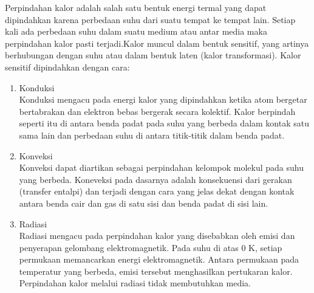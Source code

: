 
Perpindahan kalor adalah salah satu bentuk energi termal yang dapat dipindahkan karena perbedaan suhu dari suatu tempat ke tempat lain\cite{HeatTransferIncropera}. Setiap kali ada perbedaan suhu dalam suatu medium atau antar media maka perpindahan kalor pasti terjadi.Kalor muncul dalam bentuk sensitif, yang artinya berhubungan dengan suhu atau dalam bentuk laten (kalor transformasi). Kalor sensitif dipindahkan dengan cara: \cite{BuildingPhysics}

\begin{enumerate}
	\item Konduksi \\
	Konduksi mengacu pada energi kalor yang dipindahkan ketika atom bergetar bertabrakan dan elektron bebas bergerak secara kolektif. Kalor berpindah seperti itu di antara benda padat pada suhu yang berbeda dalam kontak satu sama lain dan perbedaan suhu di antara titik-titik dalam benda padat.
	\item Konveksi \\
	Konveksi dapat diartikan sebagai perpindahan kelompok molekul pada suhu yang berbeda. Koneveksi pada dasarnya adalah konsekuensi dari gerakan (transfer entalpi) dan terjadi dengan cara yang jelas dekat dengan kontak antara benda cair dan gas di satu sisi dan benda padat di sisi lain.
	\item Radiasi \\
	Radiasi mengacu pada perpindahan kalor yang disebabkan oleh emisi dan penyerapan gelombang elektromagnetik. Pada suhu di atas 0 K, setiap permukaan memancarkan energi elektromagnetik. Antara permukaan pada temperatur yang berbeda, emisi tersebut menghasilkan pertukaran kalor. Perpindahan kalor melalui radiasi tidak membutuhkan media.
\end{enumerate}

